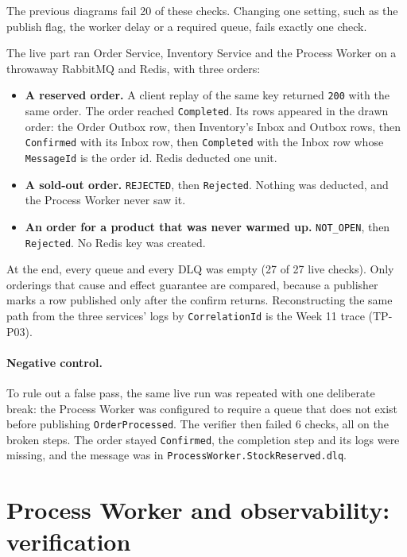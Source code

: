 \documentclass[a4paper]{report}
\begin{document}
The previous diagrams fail 20 of these checks. Changing one setting, such as
the publish flag, the worker delay or a required queue, fails exactly one
check.

The live part ran Order Service, Inventory Service and the Process Worker on
a throwaway RabbitMQ and Redis, with three orders:

\begin{itemize}
  \item \textbf{A reserved order.} A client replay of the same key returned
    \texttt{200} with the same order. The order reached \texttt{Completed}.
    Its rows appeared in the drawn order: the Order Outbox row, then
    Inventory's Inbox and Outbox rows, then \texttt{Confirmed} with its Inbox
    row, then \texttt{Completed} with the Inbox row whose
    \texttt{MessageId} is the order id. Redis deducted one unit.
  \item \textbf{A sold-out order.} \texttt{REJECTED}, then
    \texttt{Rejected}. Nothing was deducted, and the Process Worker never
    saw it.
  \item \textbf{An order for a product that was never warmed up.}
    \texttt{NOT\_OPEN}, then \texttt{Rejected}. No Redis key was created.
\end{itemize}

At the end, every queue and every DLQ was empty (27 of 27 live checks). Only
orderings that cause and effect guarantee are compared, because a publisher
marks a row published only after the confirm returns. Reconstructing the
same path from the three services' logs by \texttt{CorrelationId} is the
Week 11 trace (TP-P03).

\paragraph{Negative control.} To rule out a false pass, the same live run
was repeated with one deliberate break: the Process Worker was configured to
require a queue that does not exist before publishing \texttt{OrderProcessed}.
The verifier then failed 6 checks, all on the broken steps. The order stayed
\texttt{Confirmed}, the completion step and its logs were missing, and the
message was in \texttt{ProcessWorker.StockReserved.dlq}.


\section{Process Worker and observability: verification}\label{app:ver-worker}
\end{document}
